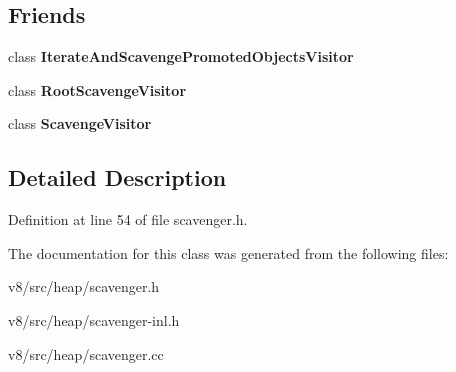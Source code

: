 \subsection*{Friends}
\begin{DoxyCompactItemize}
\item 
\mbox{\label{classv8_1_1internal_1_1Scavenger_ae47bddff04dfd2b51eee86db0aff6bf8}} 
class {\bfseries Iterate\+And\+Scavenge\+Promoted\+Objects\+Visitor}
\item 
\mbox{\label{classv8_1_1internal_1_1Scavenger_af72075cd340143a78e3ccec8f854c008}} 
class {\bfseries Root\+Scavenge\+Visitor}
\item 
\mbox{\label{classv8_1_1internal_1_1Scavenger_af69f25a1d3f42cb9878ebd5cd25ff8bb}} 
class {\bfseries Scavenge\+Visitor}
\end{DoxyCompactItemize}


\subsection{Detailed Description}


Definition at line 54 of file scavenger.\+h.



The documentation for this class was generated from the following files\+:\begin{DoxyCompactItemize}
\item 
v8/src/heap/scavenger.\+h\item 
v8/src/heap/scavenger-\/inl.\+h\item 
v8/src/heap/scavenger.\+cc\end{DoxyCompactItemize}
